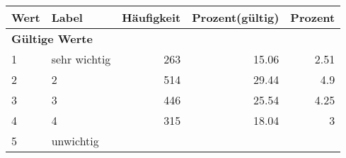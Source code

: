      \begin{longtable}{lXrrr}
     \toprule
     \textbf{Wert} & \textbf{Label} & \textbf{Häufigkeit} & \textbf{Prozent(gültig)} & \textbf{Prozent} \\
     \endhead
     \midrule
     \multicolumn{5}{l}{\textbf{Gültige Werte}}\\

     1 &
     \multicolumn{1}{X}{ sehr wichtig   } &


       \num{263} &
       \num[round-mode=places,round-precision=2]{15,06} &
         \num[round-mode=places,round-precision=2]{2,51} \\

     2 &
     \multicolumn{1}{X}{ 2   } &


       \num{514} &
       \num[round-mode=places,round-precision=2]{29,44} &
         \num[round-mode=places,round-precision=2]{4,9} \\

     3 &
     \multicolumn{1}{X}{ 3   } &


       \num{446} &
       \num[round-mode=places,round-precision=2]{25,54} &
         \num[round-mode=places,round-precision=2]{4,25} \\

     4 &
     \multicolumn{1}{X}{ 4   } &


       \num{315} &
       \num[round-mode=places,round-precision=2]{18,04} &
         \num[round-mode=places,round-precision=2]{3} \\

     5 &
     \multicolumn{1}{X}{ unwichtig   } &



\end{longtable}

